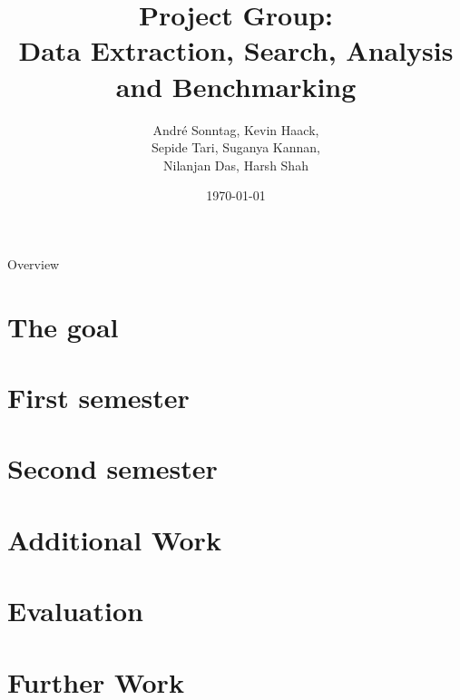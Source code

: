 \documentclass{beamer}
\title{Project Group:\\Data Extraction, Search, Analysis and Benchmarking}
\author{André Sonntag, Kevin Haack,\\Sepide Tari, Suganya Kannan,\\Nilanjan Das, Harsh Shah}
\institute{Paderborn University}
\date{\today}
\begin{document}
\begin{frame}
  \titlepage
\end{frame}

\begin{frame}{Overview}
\tableofcontents
\end{frame}

\section{The goal}


\section{First semester}











\section{Second semester}










\section{Additional Work}


\section{Evaluation}


\section{Further Work}

\end{document}
